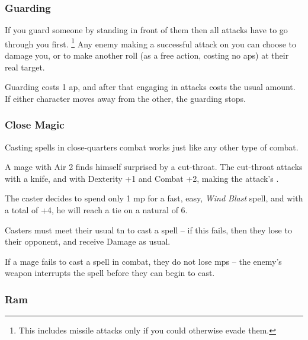 \begin{multicols}{2}
\subsubsection[Guard: Someone must successfully hit you before they are allowed to hit whomever you are guarding. Cost: 1 \gls{ap}]{Guarding}

If you guard someone by standing in front of them then all attacks have to go through you first.%
\footnote{This includes missile attacks only if you could otherwise evade them.}
Any enemy making a successful attack on you can choose to damage you, or to make another roll (as a free action, costing no \glspl{ap}) at their real target.

Guarding costs 1 \gls{ap}, and after that engaging in attacks costs the usual amount.
If either character moves away from the other, the guarding stops.

\subsubsection[Close Magic: Casters roll vs the enemy's standard Attack score]{Close Magic}

Casting spells in close-quarters combat works just like any other type of combat.

\begin{exampletext}
  A mage with Air 2 finds himself surprised by a cut-throat.
  The cut-throat attacks with a knife, and with Dexterity +1 and Combat +2, making the attack's \tn[10].

  The caster decides to spend only 1 \gls{mp} for a fast, easy, \textit{Wind Blast} spell, and with a  total of +4, he will reach a tie on a \gls{natural} of 6.
\end{exampletext}

Casters must meet their usual \gls{tn} to cast a spell -- if this fails, then they lose to their opponent, and receive Damage as usual.

If a mage fails to cast a spell in combat, they do not lose \glspl{mp} -- the enemy's weapon interrupts the spell before they can begin to cast.

\subsubsection[Ram: Push the enemy back 2 steps plus the difference between your Strength Bonuses. Resisting costs 2 \glspl{ap}, and requires a resisted Strength + Combat roll. Cost: 3 \glspl{ap}]{Ram}
\label{ram}


\end{multicols}
